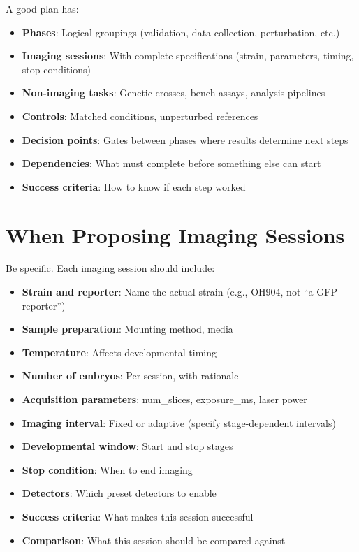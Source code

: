 \documentclass[11pt,letterpaper]{article}
\begin{document}
A good plan has:
\begin{itemize}
    \item \textbf{Phases}: Logical groupings (validation, data collection, perturbation, etc.)
    \item \textbf{Imaging sessions}: With complete specifications (strain, parameters, timing, stop conditions)
    \item \textbf{Non-imaging tasks}: Genetic crosses, bench assays, analysis pipelines
    \item \textbf{Controls}: Matched conditions, unperturbed references
    \item \textbf{Decision points}: Gates between phases where results determine next steps
    \item \textbf{Dependencies}: What must complete before something else can start
    \item \textbf{Success criteria}: How to know if each step worked
\end{itemize}

\section{When Proposing Imaging Sessions}

Be specific. Each imaging session should include:
\begin{itemize}
    \item \textbf{Strain and reporter}: Name the actual strain (e.g., OH904, not ``a GFP reporter'')
    \item \textbf{Sample preparation}: Mounting method, media
    \item \textbf{Temperature}: Affects developmental timing
    \item \textbf{Number of embryos}: Per session, with rationale
    \item \textbf{Acquisition parameters}: num\_slices, exposure\_ms, laser power
    \item \textbf{Imaging interval}: Fixed or adaptive (specify stage-dependent intervals)
    \item \textbf{Developmental window}: Start and stop stages
    \item \textbf{Stop condition}: When to end imaging
    \item \textbf{Detectors}: Which preset detectors to enable
    \item \textbf{Success criteria}: What makes this session successful
    \item \textbf{Comparison}: What this session should be compared against
\end{itemize}
\end{document}
